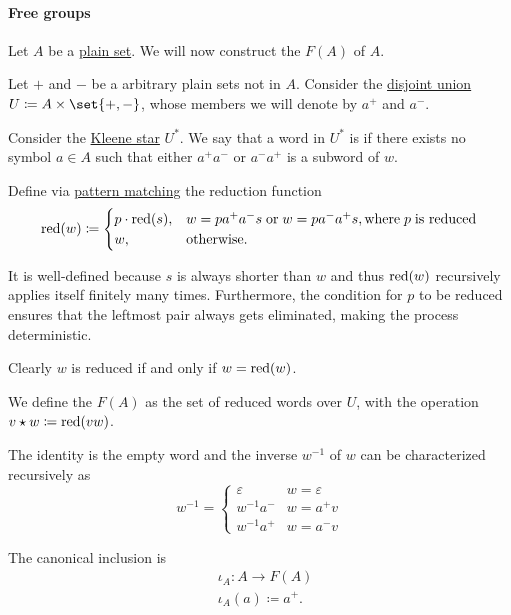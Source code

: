 \paragraph{Free groups}

\begin{definition}\label{def:free_group}\mimprovised
  Let \( A \) be a \hyperref[def:set]{plain set}. We will now construct the  \( F(A) \) of \( A \).

  Let \( + \) and \( - \) be a arbitrary plain sets not in \( A \). Consider the \hyperref[def:disjoint_union]{disjoint union} \( U \coloneqq A \times \set{ +, - } \), whose members we will denote by \( a^+ \) and \( a^- \).

  Consider the \hyperref[def:formal_language/kleene_star]{Kleene star} \( U^* \). We say that a word in \( U^* \) is  if there exists no symbol \( a \in A \) such that either \( a^+ a^- \) or \( a^- a^+ \) is a subword of \( w \).

  Define via \hyperref[con:evaluation]{pattern matching} the reduction function
  \begin{equation*}
    \red(w) \coloneqq \begin{cases}
      p \cdot \red(s), &w = p a^+ a^- s \T{or} w = p a^- a^+ s, \T{where} p \T{is reduced} \\
      w,               &\T{otherwise.}
    \end{cases}
  \end{equation*}

  It is well-defined because \( s \) is always shorter than \( w \) and thus \( \operatorname{red}(w) \) recursively applies itself finitely many times. Furthermore, the condition for \( p \) to be reduced ensures that the leftmost pair always gets eliminated, making the process deterministic.

  Clearly \( w \) is reduced if and only if \( w = \operatorname{red}(w) \).

  We define the  \( F(A) \) as the set of reduced words over \( U \), with the operation \( v \star w \coloneqq \operatorname{red}(vw) \).

  The identity is the empty word and the inverse \( w^{-1} \) of \( w \) can be characterized recursively as
  \begin{equation*}
    w^{-1} = \begin{cases}
      \varepsilon &w = \varepsilon \\
      w^{-1} a^-  &w = a^+ v \\
      w^{-1} a^+  &w = a^- v
    \end{cases}
  \end{equation*}

  The canonical inclusion is
  \begin{equation*}
    \begin{aligned}
      &\iota_A: A \to F(A) \\
      &\iota_A(a) \coloneqq a^+.
    \end{aligned}
  \end{equation*}
\end{definition}
